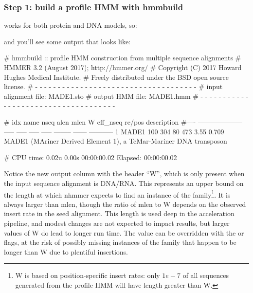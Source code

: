 \subsubsection{Step 1: build a profile HMM with hmmbuild}

 works for both protein and DNA models, so:


and you'll see some output that looks like:

\begin{samepage}
\begin{sreoutput}
# hmmbuild :: profile HMM construction from multiple sequence alignments
# HMMER 3.2 (August 2017); http://hmmer.org/
# Copyright (C) 2017 Howard Hughes Medical Institute.
# Freely distributed under the BSD open source license.
# - - - - - - - - - - - - - - - - - - - - - - - - - - - - - - - - - - - -
# input alignment file:             MADE1.sto
# output HMM file:                  MADE1.hmm
# - - - - - - - - - - - - - - - - - - - - - - - - - - - - - - - - - - - -

# idx name                  nseq  alen  mlen     W eff_nseq re/pos description
#---- -------------------- ----- ----- ----- ----- -------- ------ -----------
1     MADE1                  100   304    80   473     3.55  0.709 MADE1 (MAriner Derived Element 1), a TcMar-Mariner DNA transposon

# CPU time: 0.02u 0.00s 00:00:00.02 Elapsed: 00:00:00.02
\end{sreoutput}
\end{samepage}

Notice the new output column with the header ``W'', which is only
present when the input sequence alignment is DNA/RNA. This represents
an upper bound on the length at which nhmmer expects to find an
instance of the family\footnote{W is based on position-specific insert
  rates: only $1e-7$ of all sequences generated from the profile HMM
  will have length greater than W.}.  It is always larger than mlen,
though the ratio of mlen to W depends on the observed insert rate in
the seed alignment. This length is used deep in the acceleration
pipeline, and modest changes are not expected to impact results, but
larger values of W do lead to longer run time. The value can be
overridden with the  or  flags, at
the risk of possibly missing instances of the family that happen to be
longer than W due to plentiful insertions.




